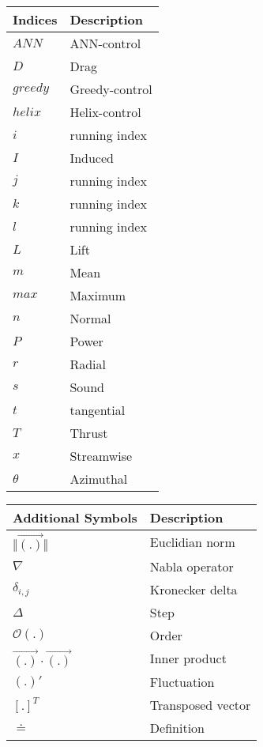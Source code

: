 \vspace{0.5cm}
\begin{longtable}{p{7cm}p{7cm}}
	Indices & Description  \\ \hline
	$ANN$	& ANN-control \\
	$D$ 	& Drag \\
	$greedy$& Greedy-control \\
	$helix$ & Helix-control \\
	$i$		& running index \\
	$I$		& Induced \\
	$j$		& running index \\
	$k$		& running index \\
	$l$		& running index \\
	$L$		& Lift \\
    $m$     & Mean \\
    $max$	& Maximum \\
    $n$		& Normal \\
    $P$		& Power \\
    $r$		& Radial \\
    $s$		& Sound \\
    $t$		& tangential \\
    $T$		& Thrust \\
    $x$		& Streamwise \\
    $\theta$& Azimuthal \\
\end{longtable}

\vspace{0.5cm}

\begin{longtable}{p{7cm}p{7cm}}
	Additional Symbols          & Description    \\ \hline
	$\Vert \vec{(.)} \Vert $    & Euclidian norm \\
	$\nabla$                    & Nabla operator \\
	$\delta_{i,j}$				& Kronecker delta \\
	$\Delta$                    & Step \\
	$\mathcal{O}(.)$			& Order \\
	$\vec{(.)} \cdot \vec{(.)}$ & Inner product \\
	$(.)'$						& Fluctuation \\
	$[.]^T$						& Transposed vector \\
	$\doteq$					& Definition \\
\end{longtable}

